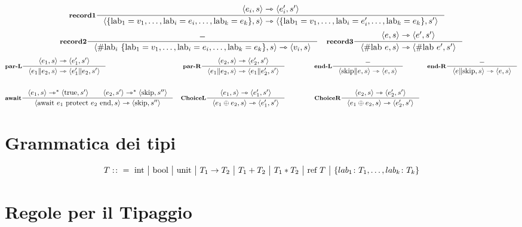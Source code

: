 \documentclass[a4paper, 10pt]{article}
\newcommand{\integer}{\textup{int}}
\newcommand{\bool}{\textup{bool}}
\newcommand{\infer}[4]{\inference[\textbf{#1}]{#2}{#3}#4 }
\newcommand{\srule}[2]{\langle #1 \rangle \rightarrowtriangle \langle #2 \rangle}
\newcommand{\ssrule}[2]{\langle #1 \rangle \rightarrowtriangle^{*} \langle #2 \rangle}
\begin{document}
	\newpage
	\begin{minipage}{.45\linewidth}
		\begin{flushleft}
			\begin{align*}
				&\infer{record1}{\srule{e_i, s}{e_i', s'}}{\srule{\{\text{lab}_1 = v_1, \dots, \text{lab}_i = e_i, \dots, \text{lab}_k = e_k \}, s}{\{\text{lab}_1 = v_1, \dots, \text{lab}_i = e_i', \dots, \text{lab}_k = e_k \}, s'}}{}
			\end{align*}
			\begin{align*}
				&\infer{record2}{-}{\srule{\# \text{lab}_i\ \{\text{lab}_1 = v_1, \dots, \text{lab}_i = e_i, \dots, \text{lab}_k = e_k \}, s}{v_i, s}}{}
				&\infer{record3}{\srule{e, s}{e', s'}}{\srule{\# \text{lab } e, s}{\# \text{lab } e', s'}}{}
			\end{align*}
			\begin{align*}
				&\infer{par-L}{\srule{e_1,s}{e_1', s'}}{\srule{e_1\| e_2, s}{e_1'\| e_2 , s'}}{}
				&\infer{par-R}{\srule{e_2,s}{e_2', s'}}{\srule{e_1\| e_2, s}{e_1\| e_2' , s'}}{}\qquad\qquad
				&\infer{end-L}{-}{\srule{\textup{skip}\| e, s}{e , s}}{}
				&\infer{end-R}{-}{\srule{e \| \textup{skip}, s}{e , s}}{} \\ \\
				&\infer{await}{\ssrule{e_1, s}{\textup{true}, s'}\qquad \ssrule{e_2, s'}{\textup{skip}, s''}}{
					\srule{\textup{await}\ e_1\ \textup{protect}\ e_2\ \textup{end}, s}{\textup{skip}, s''}}{}  
				&\infer{ChoiceL}{\srule{e_1, s}{e_1', s'}}{\srule{e_1 \oplus e_2, s}{e_1', s'}}{} \qquad\qquad
				&\infer{ChoiceR}{\srule{e_2, s}{e_2', s'}}{\srule{e_1 \oplus e_2, s}{e_2', s'}}{} 
			\end{align*}
		\end{flushleft}
	\end{minipage}
\section*{Grammatica dei tipi}
	\[
		T:\colon=\ \integer\ \big|\ \bool\ \big|\ \textup{unit}\ \big|\ T_1\rightarrow T_2\ \big|\ T_1 + T_2\ \big|\ T_1 * T_2\ 
		\big|\ \textup{ref}\ T\ \big|\ \{lab_1\colon T_1, \dots, lab_k\colon T_k \}
	\]	
	
\section*{Regole per il Tipaggio}
\end{document}
